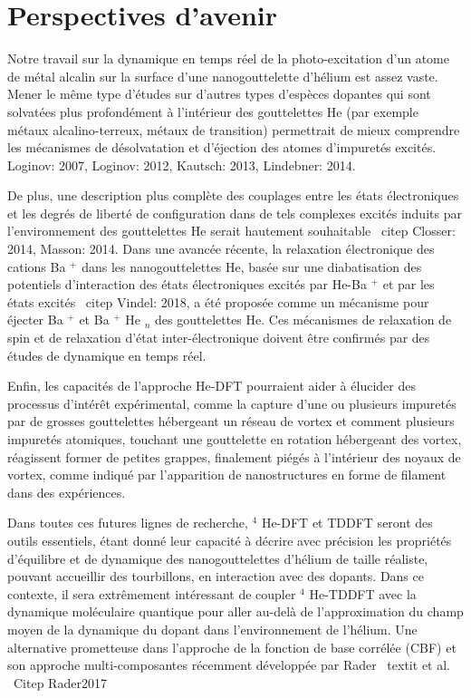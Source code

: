 	\section*{Perspectives d'avenir}
		Notre travail sur la dynamique en temps réel de la photo-excitation d'un atome de métal alcalin sur la surface d'une nanogouttelette d'hélium est assez vaste. Mener le même type d'études sur d'autres types d'espèces dopantes qui sont solvatées plus profondément à l'intérieur des gouttelettes He (par exemple métaux alcalino-terreux, métaux de transition) permettrait de mieux comprendre les mécanismes de désolvatation et d'éjection des atomes d'impuretés excités. {Loginov: 2007, Loginov: 2012, Kautsch: 2013, Lindebner: 2014}.
		
		De plus, une description plus complète des couplages entre les états électroniques et les degrés de liberté de configuration dans de tels complexes excités induits par l'environnement des gouttelettes He serait hautement souhaitable \ citep {Closser: 2014, Masson: 2014}. Dans une avancée récente, la relaxation électronique des cations Ba $ ^ + $ dans les nanogouttelettes He, basée sur une diabatisation des potentiels d'interaction des états électroniques excités par He-Ba $ ^ + $ et par les états excités \ citep {Vindel: 2018}, a été proposée comme un mécanisme pour éjecter Ba $ ^ + $ et Ba $ ^ + $ He $ _n $ des gouttelettes He. Ces mécanismes de relaxation de spin et de relaxation d'état inter-électronique doivent être confirmés par des études de dynamique en temps réel.
		
		Enfin, les capacités de l'approche He-DFT pourraient aider à élucider des processus d'intérêt expérimental, comme la capture d'une ou plusieurs impuretés par de grosses gouttelettes hébergeant un réseau de vortex et comment plusieurs impuretés atomiques, touchant une gouttelette en rotation hébergeant des vortex, réagissent former de petites grappes, finalement piégés à l'intérieur des noyaux de vortex, comme indiqué par l'apparition de nanostructures en forme de filament dans des expériences.
		
		Dans toutes ces futures lignes de recherche, $ ^ 4 $ He-DFT et TDDFT seront des outils essentiels, étant donné leur capacité à décrire avec précision les propriétés d'équilibre et de dynamique des nanogouttelettes d'hélium de taille réaliste, pouvant accueillir des tourbillons, en interaction avec des dopants. Dans ce contexte, il sera extrêmement intéressant de coupler $ ^ 4 $ He-TDDFT avec la dynamique moléculaire quantique pour aller au-delà de l'approximation du champ moyen de la dynamique du dopant dans l'environnement de l'hélium. Une alternative prometteuse dans l'approche de la fonction de base corrélée (CBF) et son approche multi-composantes récemment développée par Rader \ textit {et al.} \ Citep {Rader2017}